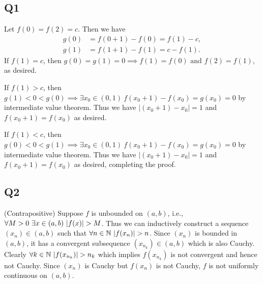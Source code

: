 \documentclass[12pt,lettersize]{article}
\newcommand{\N}{\mathbb{N}}
\begin{document}
	
	\subsection*{Q1}
	Let $f(0)=f(2)=c$. Then we have
	\begin{align*}
		g(0) &= f(0+1)-f(0)=f(1)-c,\\
		g(1) &= f(1+1)-f(1)=c-f(1).
	\end{align*}
	If $f(1)=c$, then $g(0)=g(1)=0\implies f(1)=f(0)\text{ and }f(2)=f(1)$, as desired.\smallskip
	
	If $f(1)>c$, then $g(1)<0<g(0)\implies \exists x_0\in(0,1)\ f(x_0+1)-f(x_0)=g(x_0)=0$ by intermediate value theorem. Thus we have $|(x_0+1)-x_0|=1$ and $f(x_0+1)=f(x_0)$ as desired.\smallskip
	
	If $f(1)<c$, then $g(0)<0<g(1)\implies \exists x_0\in(0,1)\ f(x_0+1)-f(x_0)=g(x_0)=0$ by intermediate value theorem. Thus we have $|(x_0+1)-x_0|=1$ and $f(x_0+1)=f(x_0)$ as desired, completing the proof.
	\newpage
	
	\subsection*{Q2}
	(Contrapositive) Suppose $f$ is unbounded on $(a,b)$, i.e., $\forall M>0\ \exists x\in(a,b)\ \abs{f(x)}>M$. Thus we can inductively construct a sequence $(x_n)\in(a,b)$ such that $\forall n\in\N\ \abs{f(x_n)}>n$. Since $(x_n)$ is bounded in $(a,b)$, it has a convergent subsequence $(x_{n_k})\in(a,b)$ which is also Cauchy. Clearly $\forall k\in\N\ \abs{f(x_{n_k})}>n_k$ which implies $f(x_{n_k})$ is not convergent and hence not Cauchy. Since $(x_n)$ is Cauchy but $f(x_n)$ is not Cauchy, $f$ is not uniformly continuous on $(a,b)$.  
	\newpage
	
\end{document}

